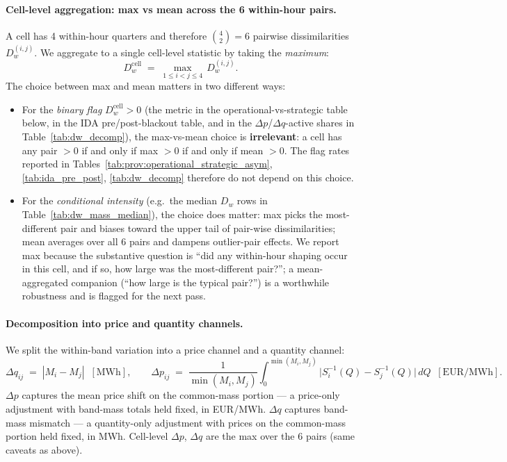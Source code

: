 \documentclass[11pt,a4paper]{article}
\begin{document}
\paragraph{Cell-level aggregation: max vs mean across the 6 within-hour pairs.}
A cell has 4 within-hour quarters and therefore $\binom{4}{2} = 6$ pairwise dissimilarities $D_w^{(i,j)}$. We aggregate to a single cell-level statistic by taking the \emph{maximum}:
\[
  D^{\text{cell}}_w \;=\; \max_{1\le i<j\le 4}\,D^{(i,j)}_w.
\]
The choice between max and mean matters in two different ways:
\begin{itemize}
\item For the \emph{binary flag} $D^{\text{cell}}_w > 0$ (the metric in the operational-vs-strategic table below, in the IDA pre/post-blackout table, and in the $\Delta p$/$\Delta q$-active shares in Table~\ref{tab:dw_decomp}), the max-vs-mean choice is \textbf{irrelevant}: a cell has any pair $> 0$ if and only if max $> 0$ if and only if mean $> 0$. The flag rates reported in Tables~\ref{tab:prov:operational_strategic_asym}, \ref{tab:ida_pre_post}, \ref{tab:dw_decomp} therefore do not depend on this choice.
\item For the \emph{conditional intensity} (e.g.\ the median $D_w$ rows in Table~\ref{tab:dw_mass_median}), the choice does matter: max picks the most-different pair and biases toward the upper tail of pair-wise dissimilarities; mean averages over all 6 pairs and dampens outlier-pair effects. We report max because the substantive question is ``did any within-hour shaping occur in this cell, and if so, how large was the most-different pair?''; a mean-aggregated companion (``how large is the typical pair?'') is a worthwhile robustness and is flagged for the next pass.
\end{itemize}

\paragraph{Decomposition into price and quantity channels.}
We split the within-band variation into a price channel and a quantity channel:
\[
  \Delta q_{ij} \;=\; |M_i - M_j|\;\;[\text{MWh}],
  \qquad
  \Delta p_{ij} \;=\; \frac{1}{\min(M_i, M_j)}\int_{0}^{\min(M_i, M_j)}\!\!\big|S_i^{-1}(Q) - S_j^{-1}(Q)\big|\,dQ\;\;[\text{EUR/MWh}].
\]
$\Delta p$ captures the mean price shift on the common-mass portion --- a price-only adjustment with band-mass totals held fixed, in EUR/MWh. $\Delta q$ captures band-mass mismatch --- a quantity-only adjustment with prices on the common-mass portion held fixed, in MWh. Cell-level $\Delta p$, $\Delta q$ are the max over the 6 pairs (same caveats as above).
\end{document}
